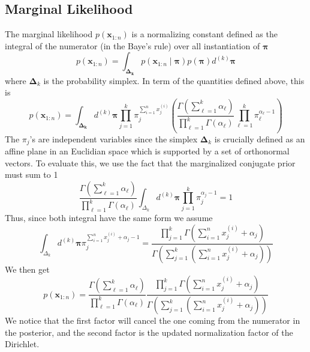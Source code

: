 \documentclass{article}
\newcommand{\s}{\hspace{0.1cm}}
\numberwithin{equation}{section}
\begin{document}
\subsection{Marginal Likelihood}
 The marginal likelihood $p(\mathbf{x}_{1:n})$ 
is a normalizing constant defined as the 
integral of the numerator (in the Baye's rule) over all instantiation of $\bm{ \pi} $
\[
        p(\mathbf{x}_{1:n}) = \int_{\bm{ \Delta_k}} 
        p(\mathbf{x}_{1:n} \mid \bm{ \pi})  p(\bm{ \pi} )d^{(k)}\bm{ \pi}  
\]
where $\bm{ \Delta}_k $ is the probability simplex. In term of the quantities 
defined above, this is
\[
         p(\mathbf{x}_{1:n}) = \int_{\bm{ \Delta_k}} 
         d^{(k)}\bm{ \pi} 
         \prod_{j = 1}^k \pi_j^{\sum_{i =1}^n x_j^{(i)}}
        \left( 
         \frac{\Gamma ( \sum _{\ell = 1}^k \alpha_\ell) }{\prod_{\ell=1}^k \Gamma(\alpha_\ell)} 
         \prod_{\ell = 1}^k \pi_\ell^{\alpha_\ell - 1}
        \right) 
\]
The $\pi_j$'s are independent variables since the simplex $\bm{ \Delta}_k $ is crucially 
defined as an affine plane in an Euclidian space which is supported by 
a set of orthonormal vectors.
To evaluate this, we use the fact that the marginalized conjugate prior must sum to 1
\[
        \frac{\Gamma ( \sum _{\ell = 1}^k \alpha_\ell) }{\prod_{\ell=1}^k \Gamma(\alpha_\ell)} 
        \int_{\Delta_k} d^{(k)}\bm{ \pi} \prod_{j =1}^k \pi_j^{\alpha_j - 1} = 1
\]
Thus, since both integral have the same form we assume
\[
\int_{\Delta_k} d^{(k)}\bm{ \pi}  \pi_j^{\sum_{i = 1}^n x_j^{(i)} + \alpha_j - 1}
        =
        \frac{\prod_{j = 1}^k \Gamma(\sum_{i = 1}^n x_j^{(i)} + \alpha_j)}{
        \Gamma\left(\sum_{j = 1}^k \left( \sum_{i = 1}^n x_j^{(i)} + \alpha_j \right) \right)}
\]
We then get
\[
        \boxed{p(\mathbf{x}_{1:n}) = 
         \frac{\Gamma ( \sum _{\ell = 1}^k \alpha_\ell) }{\prod_{\ell=1}^k \Gamma(\alpha_\ell)} 
        \frac{\prod_{j = 1}^k \Gamma(\sum_{i = 1}^n x_j^{(i)} + \alpha_j)}{
        \Gamma\left(\sum_{j = 1}^k \left( \sum_{i = 1}^n x_j^{(i)} + \alpha_j \right) \right)}
}
\]
We notice that the first factor will cancel the one coming from the numerator in the 
posterior, and the second factor is the updated normalization factor of the Dirichlet.
\end{document}
